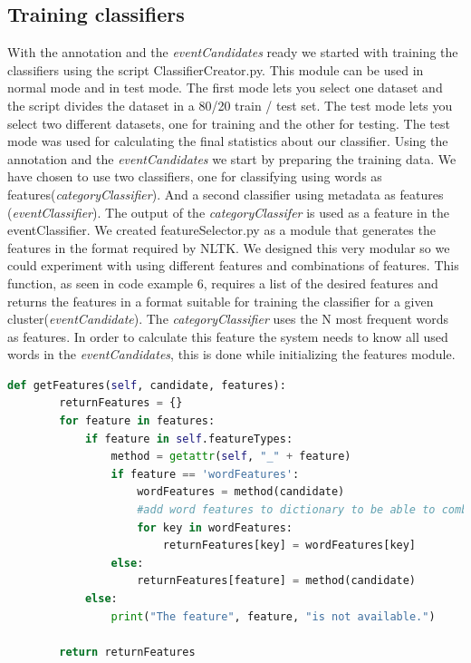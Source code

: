 \documentclass[
10pt, %
a4paper, %
oneside, %
headinclude,footinclude, %
BCOR5mm, %
]{scrartcl}
\begin{document}
\subsection{Training classifiers}
With the annotation and the \textit{eventCandidates} ready we started with training the classifiers using the script ClassifierCreator.py. This module can be used in normal mode and in test mode. The first mode lets you select one dataset and the script divides the dataset in a 80/20 train / test set. The test mode lets you select two different datasets, one for training and the other for testing. The test mode was used for calculating the final statistics about our classifier.
\vl
Using the annotation and the \textit{eventCandidates} we start by preparing the training data. We have chosen to use two classifiers, one for classifying using words as features(\textit{categoryClassifier}). And a second classifier using metadata as features (\textit{eventClassifier}). The output of the \textit{categoryClassifer} is used as a feature in the eventClassifier.
\vl
We created featureSelector.py as a module that generates the features in the format required by NLTK. We designed this very modular so we could experiment with using different features and combinations of features. 
\vl
This function, as seen in code example 6, requires a list of the desired features and returns the features in a format suitable for training the classifier for a given cluster(\textit{eventCandidate}).\vl
The \textit{categoryClassifier} uses the N most frequent words as features. In order to calculate this feature the system needs to know all used words in the \textit{eventCandidates}, this is done while initializing the features module.

\begin{lstlisting}[language=Python, caption=Selecting features]
def getFeatures(self, candidate, features):
        returnFeatures = {}
        for feature in features:
            if feature in self.featureTypes:
                method = getattr(self, "_" + feature)
                if feature == 'wordFeatures':
                    wordFeatures = method(candidate)
                    #add word features to dictionary to be able to combine features
                    for key in wordFeatures:
                        returnFeatures[key] = wordFeatures[key]
                else:
                    returnFeatures[feature] = method(candidate)
            else:
                print("The feature", feature, "is not available.")

        return returnFeatures
\end{lstlisting}
\end{document}
